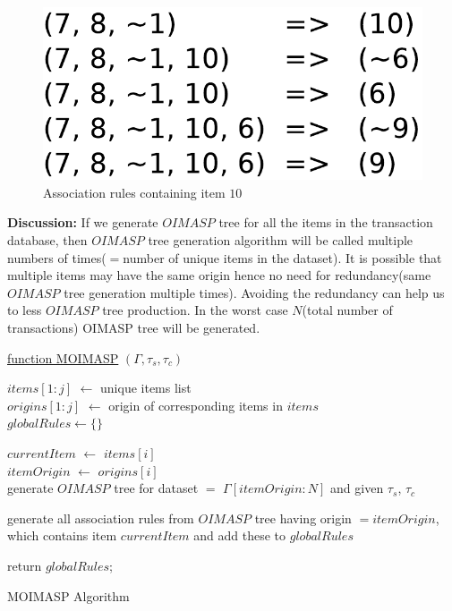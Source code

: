 \documentclass[review]{elsarticle}
\begin{document}
\begin{figure}
\begin{center}
\includegraphics[scale=0.35]{pdf/arules10}
\end{center}
\caption{Association rules containing item $ 10 $}
\label{Fig 10}
\end{figure}

\textbf{Discussion:} If we generate $ OIMASP $ tree for all the items in the transaction database, then $ OIMASP $ tree generation algorithm will be called multiple numbers of times($ = $number of unique items in the dataset). It is possible that multiple items may have the same origin hence no need for redundancy(same $ OIMASP $ tree generation multiple times). Avoiding the redundancy can help us to less $ OIMASP $ tree production. In the worst case $ N $(total number of transactions) OIMASP tree will be generated.

\begin{algorithm}

    \underline{function MOIMASP} $ (\Gamma, \tau _{s}, \tau _{c}) $\;
       
    $ items[1:j] $ $ \leftarrow $ unique items list \\
    $ origins[1:j] $ $ \leftarrow $ origin of corresponding items in $ items $ \\       
    $ globalRules \leftarrow \lbrace \rbrace $
       
	  {
		$ currentItem $ $ \leftarrow $ $ items[i] $ \\
		$ itemOrigin $ $ \leftarrow $ $ origins[i] $ \\
			  	
      	  {
            generate $ OIMASP $ tree for dataset $ = $ $ \Gamma[itemOrigin:N] $ and given $ \tau _{s} $, $ 				\tau _{c} $
          }	
          
		generate all association rules from $ OIMASP $ tree having origin $ = itemOrigin $, which contains 			item $ currentItem $ and add these to $ globalRules $
	  }
	          		
	return $ globalRules $;      
    \caption{MOIMASP Algorithm}
\end{algorithm}
\end{document}
